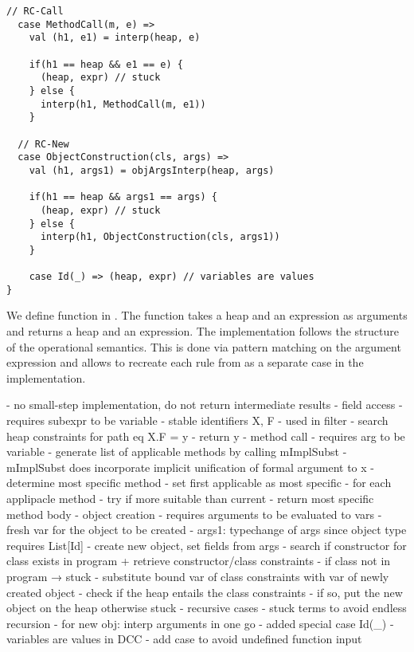 \begin{lstlisting}[caption={Interpreter},label=lst:interp,captionpos=b,frame={lines}]
  // RC-Call
  case MethodCall(m, e) =>
    val (h1, e1) = interp(heap, e)

    if(h1 == heap && e1 == e) {
      (heap, expr) // stuck
    } else {
      interp(h1, MethodCall(m, e1))
    }
    
  // RC-New
  case ObjectConstruction(cls, args) =>
    val (h1, args1) = objArgsInterp(heap, args)

    if(h1 == heap && args1 == args) {
      (heap, expr) // stuck
    } else {
      interp(h1, ObjectConstruction(cls, args1))
    }
    
    case Id(_) => (heap, expr) // variables are values
}
\end{lstlisting}
%
\newpage
We define function  in .
The function takes a heap and an expression
as arguments and returns a heap and an expression.
The implementation follows the structure of the operational
semantics.
This is done via pattern matching on the argument expression
and allows to recreate each rule from 
as a separate case in the implementation.

- no small-step implementation, do not return intermediate results
- field access
  - requires subexpr to be variable
  - stable identifiers X, F
    - used in filter
    - search heap constraints for path eq X.F = y
    - return y
- method call
  - requires arg to be variable
  - generate list of applicable methods
    by calling mImplSubst
  - mImplSubst does incorporate implicit unification of formal argument to x
  - determine most specific method
    - set first applicable as most specific
    - for each applipacle method
      - try if more suitable than current
  - return most specific method body
- object creation
  - requires arguments to be evaluated to vars
  - fresh var for the object to be created
  - args1: typechange of args since object type requires List[Id]
  - create new object, set fields from args
  - search if constructor for class exists in program
    + retrieve constructor/class constraints
  - if class not in program → stuck
  - substitute bound var of class constraints
    with var of newly created object
  - check if the heap entails the class constraints
  - if so, put the new object on the heap
    otherwise stuck
- recursive cases
  - stuck terms to avoid endless recursion
  - for new obj: interp arguments in one go  
- added special case Id(_)
  - variables are values in DCC
  - add case to avoid undefined function input

